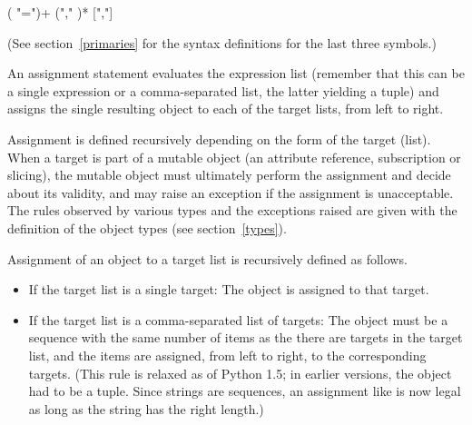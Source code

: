 \begin{productionlist}
             {( "=")+ }
             { ("," )* [","]}
             {}
\end{productionlist}

(See section~\ref{primaries} for the syntax definitions for the last
three symbols.)

An assignment statement evaluates the expression list (remember that
this can be a single expression or a comma-separated list, the latter
yielding a tuple) and assigns the single resulting object to each of
the target lists, from left to right.

Assignment is defined recursively depending on the form of the target
(list).  When a target is part of a mutable object (an attribute
reference, subscription or slicing), the mutable object must
ultimately perform the assignment and decide about its validity, and
may raise an exception if the assignment is unacceptable.  The rules
observed by various types and the exceptions raised are given with the
definition of the object types (see section~\ref{types}).

Assignment of an object to a target list is recursively defined as
follows.

\begin{itemize}
\item
If the target list is a single target: The object is assigned to that
target.

\item
If the target list is a comma-separated list of targets: The object
must be a sequence with the same number of items as the there are
targets in the target list, and the items are assigned, from left to
right, to the corresponding targets.  (This rule is relaxed as of
Python 1.5; in earlier versions, the object had to be a tuple.  Since
strings are sequences, an assignment like  is
now legal as long as the string has the right length.)

\end{itemize}

